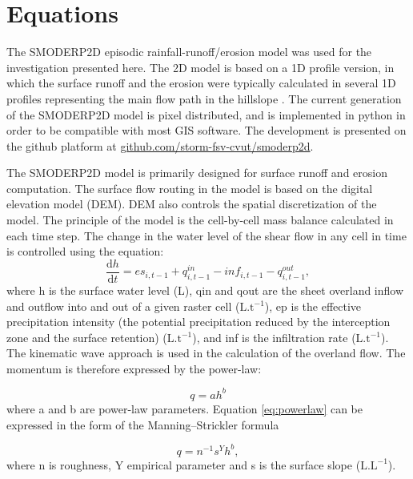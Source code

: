 \section{Equations}


The SMODERP2D episodic rainfall-runoff/erosion model was used for the
investigation presented here. The 2D model is based on a 1D profile version, in
which the surface runoff and the erosion were typically calculated in several
1D profiles representing the main flow path in the hillslope \cite{Dostal2000}.
The current generation of the SMODERP2D model is pixel distributed, and is
implemented in python in order to be compatible with most GIS software. The
development is presented on the github platform at
\href{https://github.com/storm-fsv-cvut/smoderp2d}{github.com/storm-fsv-cvut/smoderp2d}.

The SMODERP2D model is primarily designed for surface runoff and erosion
computation. The surface flow routing in the model is based on the digital
elevation model (DEM). DEM also controls the spatial discretization of the
model. The principle of the model is the cell-by-cell mass balance calculated
in each time step. The change in the water level of the shear flow in any cell
in time is controlled using the equation: 
\begin{equation} 
\frac{\mathrm{d}h}{\mathrm{d}t} = es_{i,t-1} + q^{in}_{i,t-1} - inf_{i,t-1} - q^{out}_{i,t-1},
\label{eq:bilance}
\end{equation}
where h is the surface water level (L), qin and qout are the sheet overland
inflow and outflow into and out of a given raster cell ($\mathrm{L.t^{-1}}$),
ep is the effective precipitation intensity (the potential precipitation
reduced by the interception zone and the surface retention)
($\mathrm{L.t^{-1}}$), and inf is the infiltration rate ($\mathrm{L.t^{-1}}$).
The kinematic wave approach is used in the calculation of the overland flow.
The momentum is therefore expressed by the power-law:

\begin{equation} 
q = ah^b
\label{eq:powerlaw}
\end{equation}
where a and b are power-law parameters. Equation \ref{eq:powerlaw} can be expressed in the form of the Manning–Strickler formula


\begin{equation} 
q = n^{-1} s^Y h^b,
\label{eq:powerlaw}
\end{equation}
where n is roughness,  Y  empirical parameter and s is the surface slope ($\mathrm{L.L^{-1}}$).


